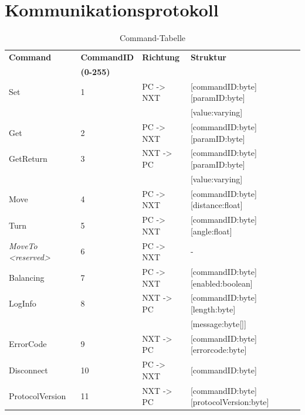 \documentclass[oneside,abstractoff,a4paper]{scrartcl}
\begin{document}
\section{Kommunikationsprotokoll}

\begin{table}
	\caption{Command-Tabelle}
	\begin{tabular}{|l|l|l|l|}
		\hline
		\textbf{Command} & \textbf{CommandID} & \textbf{Richtung} & 		\textbf{Struktur} \\
         & \textbf{(0-255)} & & \\
		\hline
		Set & 1 & PC -> NXT & [commandID:byte][paramID:byte]\\
         & & & [value:varying] \\
		\hline
		Get & 2 & PC -> NXT & [commandID:byte][paramID:byte] \\
		\hline
		GetReturn & 3 & NXT -> PC & [commandID:byte][paramID:byte] \\
         & & & [value:varying] \\
		\hline
		Move & 4 & PC -> NXT & [commandID:byte][distance:float] \\
		\hline
		Turn & 5 & PC -> NXT & [commandID:byte][angle:float] \\
		\hline
		\textit{MoveTo <reserved>} & 6 & PC -> NXT & - \\
		\hline
		Balancing & 7 & PC -> NXT & [commandID:byte][enabled:boolean] \\
		\hline
		LogInfo & 8 & NXT -> PC & [commandID:byte][length:byte] \\
         & & & [message:byte[]] \\
		\hline
		ErrorCode & 9 & NXT -> PC & [commandID:byte][errorcode:byte] \\
		\hline
		Disconnect & 10 & PC -> NXT & [commandID:byte] \\
		\hline
		ProtocolVersion & 11 & NXT -> PC & [commandID:byte][protocolVersion:byte] \\
		\hline
	\end{tabular}
	\label{tab:cmdTable}
\end{table}
\end{document}
